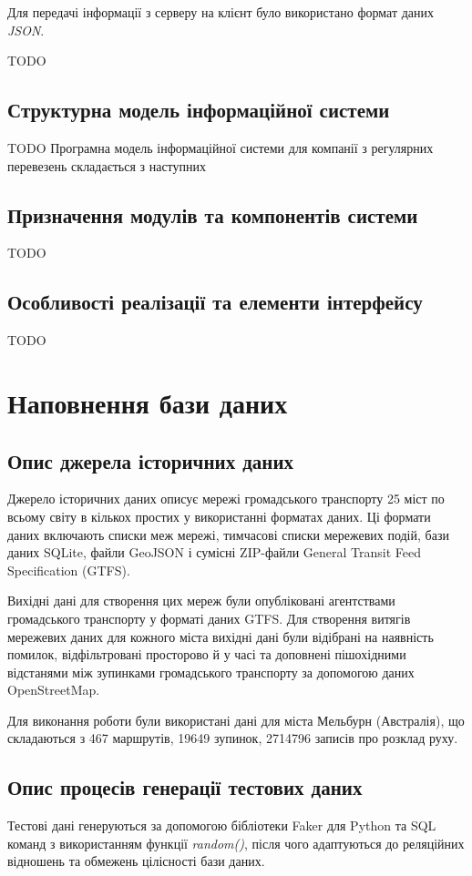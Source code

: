 \documentclass[oneside,14pt]{extarticle}
\begin{document}
Для передачі інформації з серверу на клієнт було використано формат даних \textit{JSON}.

TODO

\subsection{Структурна модель інформаційної системи}
TODO Програмна модель інформаційної системи для компанії з регулярних перевезень складається з наступних

\subsection{Призначення модулів та компонентів системи}
TODO

\subsection{Особливості реалізації та елементи інтерфейсу}
TODO

\newpage

\section{Наповнення бази даних}
\subsection{Опис джерела історичних даних}
Джерело історичних даних описує мережі громадського транспорту 25 міст по всьому світу в кількох простих у використанні форматах даних. Ці формати даних включають списки меж мережі, тимчасові списки мережевих подій, бази даних SQLite, файли GeoJSON і сумісні ZIP-файли General Transit Feed Specification (GTFS).

Вихідні дані для створення цих мереж були опубліковані агентствами громадського транспорту у форматі даних GTFS. Для створення витягів мережевих даних для кожного міста вихідні дані були відібрані на наявність помилок, відфільтровані просторово й у часі та доповнені пішохідними відстанями між зупинками громадського транспорту за допомогою даних OpenStreetMap.

Для виконання роботи були використані дані для міста Мельбурн (Австралія), що складаються з 467 маршрутів, 19649 зупинок, 2714796 записів про розклад руху.

\subsection{Опис процесів генерації тестових даних}
Тестові дані генеруються за допомогою бібліотеки Faker для Python та SQL команд з використанням функції \textit{random()}, після чого адаптуються до реляційних відношень та обмежень цілісності бази даних. 
\end{document}
